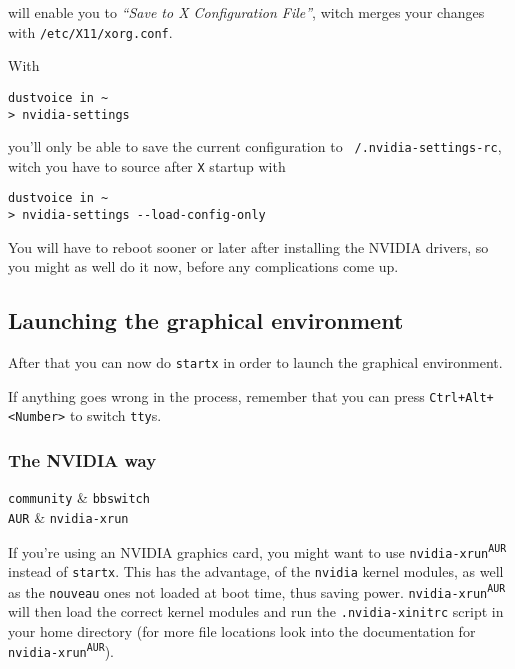 \documentclass[10pt]{dustdoc}
\begin{document}
\noindent
will enable you to \emph{``Save to X Configuration File''}, witch merges your changes with \texttt{/etc/X11/xorg.conf}.

With

\begin{verbatim}
dustvoice in ~
> nvidia-settings
\end{verbatim}


\noindent
you’ll only be able to save the current configuration to \texttt{~/.nvidia-settings-rc}, witch you have to source after \texttt{X} startup with

\begin{verbatim}
dustvoice in ~
> nvidia-settings --load-config-only
\end{verbatim}


\begin{NOTE}
    You will have to reboot sooner or later after installing the NVIDIA drivers, so you might as well do it now, before any complications come up.
\end{NOTE}

\subsection{Launching the graphical environment}%
\label{sec:launching-the-graphical-environment}

After that you can now do \texttt{startx} in order to launch the graphical environment.

If anything goes wrong in the process, remember that you can press \texttt{Ctrl+Alt+<Number>} to switch \texttt{tty}s.

\subsubsection{The NVIDIA way}%
\label{sec:the-nvidia-way}

\begin{pkgtable}
    \texttt{community} & \texttt{bbswitch} \\
    \texttt{AUR} & \texttt{nvidia-xrun} \\
\end{pkgtable}

If you’re using an NVIDIA graphics card, you might want to use \texttt{nvidia-xrun\textsuperscript{\texttt{AUR}}} instead of \texttt{startx}.
This has the advantage, of the \texttt{nvidia} kernel modules, as well as the \texttt{nouveau} ones not loaded at boot time, thus saving power.
\texttt{nvidia-xrun\textsuperscript{\texttt{AUR}}} will then load the correct kernel modules and run the \texttt{.nvidia-xinitrc} script in your home directory (for more file locations look into the documentation for \texttt{nvidia-xrun\textsuperscript{\texttt{AUR}}}).
\end{document}
